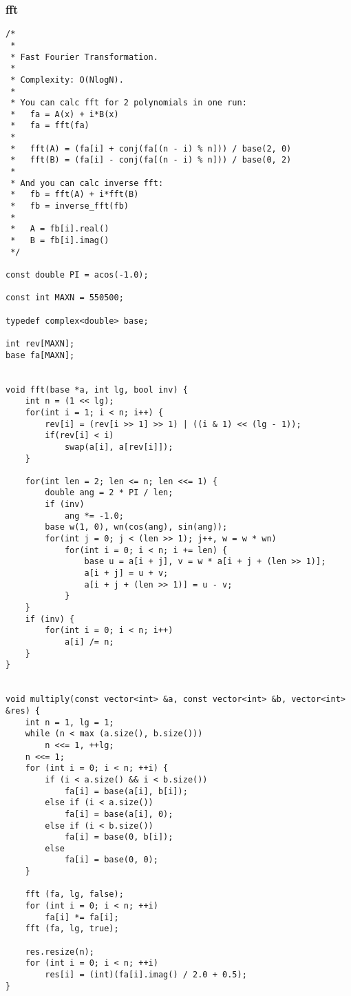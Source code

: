 \subsubsection{fft}
\begin{lstlisting}
/*
 *
 * Fast Fourier Transformation.
 *
 * Complexity: O(NlogN).
 *
 * You can calc fft for 2 polynomials in one run:
 *   fa = A(x) + i*B(x)
 *   fa = fft(fa)
 *
 *   fft(A) = (fa[i] + conj(fa[(n - i) % n])) / base(2, 0)
 *   fft(B) = (fa[i] - conj(fa[(n - i) % n])) / base(0, 2)
 *
 * And you can calc inverse fft:
 *   fb = fft(A) + i*fft(B)
 *   fb = inverse_fft(fb)
 *
 *   A = fb[i].real()
 *   B = fb[i].imag()
 */

const double PI = acos(-1.0);

const int MAXN = 550500;

typedef complex<double> base;

int rev[MAXN];
base fa[MAXN];


void fft(base *a, int lg, bool inv) {
    int n = (1 << lg);
    for(int i = 1; i < n; i++) {
        rev[i] = (rev[i >> 1] >> 1) | ((i & 1) << (lg - 1));
        if(rev[i] < i)
            swap(a[i], a[rev[i]]);
    }

    for(int len = 2; len <= n; len <<= 1) {
        double ang = 2 * PI / len;
        if (inv)
            ang *= -1.0;
        base w(1, 0), wn(cos(ang), sin(ang));
        for(int j = 0; j < (len >> 1); j++, w = w * wn)
            for(int i = 0; i < n; i += len) {
                base u = a[i + j], v = w * a[i + j + (len >> 1)];
                a[i + j] = u + v;
                a[i + j + (len >> 1)] = u - v;
            }
    }
    if (inv) {
        for(int i = 0; i < n; i++)
            a[i] /= n;
    }
}


void multiply(const vector<int> &a, const vector<int> &b, vector<int> &res) {
    int n = 1, lg = 1;
    while (n < max (a.size(), b.size()))
        n <<= 1, ++lg;
    n <<= 1;
    for (int i = 0; i < n; ++i) {
        if (i < a.size() && i < b.size())
            fa[i] = base(a[i], b[i]);
        else if (i < a.size())
            fa[i] = base(a[i], 0);
        else if (i < b.size())
            fa[i] = base(0, b[i]);
        else
            fa[i] = base(0, 0);
    }

    fft (fa, lg, false);
    for (int i = 0; i < n; ++i)
        fa[i] *= fa[i];
    fft (fa, lg, true);

    res.resize(n);
    for (int i = 0; i < n; ++i)
        res[i] = (int)(fa[i].imag() / 2.0 + 0.5);
}

\end{lstlisting}
